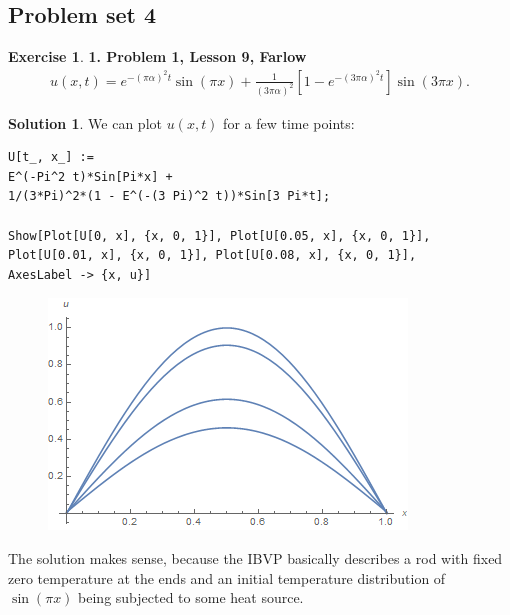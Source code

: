\documentclass{article}
\theoremstyle{definition}
\newtheorem*{exer*}{Exercise}
\newtheorem*{sln*}{Solution}
\begin{document}
\newpage
\subsection{Problem set 4}

\begin{exer*}\textbf{1. Problem 1, Lesson 9, Farlow}
	\begin{align*}
	u(x,t) = e^{-(\pi\alpha)^2t}\sin(\pi x) + \frac{1}{(3\pi \alpha)^2}\left[1 - e^{-(3\pi \alpha)^2 t}\right]\sin(3\pi x).
	\end{align*}
	\begin{sln*}
		We can plot $u(x,t)$ for a few time points:
		\begin{lstlisting}
U[t_, x_] := 
E^(-Pi^2 t)*Sin[Pi*x] + 
1/(3*Pi)^2*(1 - E^(-(3 Pi)^2 t))*Sin[3 Pi*t];

Show[Plot[U[0, x], {x, 0, 1}], Plot[U[0.05, x], {x, 0, 1}],
Plot[U[0.01, x], {x, 0, 1}], Plot[U[0.08, x], {x, 0, 1}], 
AxesLabel -> {x, u}]
		\end{lstlisting}
		
		\begin{figure}[h!]
			\centering
			\includegraphics[scale=0.7]{pde4_1.png}
		\end{figure}
	
	The solution makes sense, because the IBVP basically describes a rod with fixed zero temperature at the ends and an initial temperature distribution of $\sin(\pi x)$ being subjected to some heat source. 
	\end{sln*}
\end{exer*}

\newpage
\end{document}
